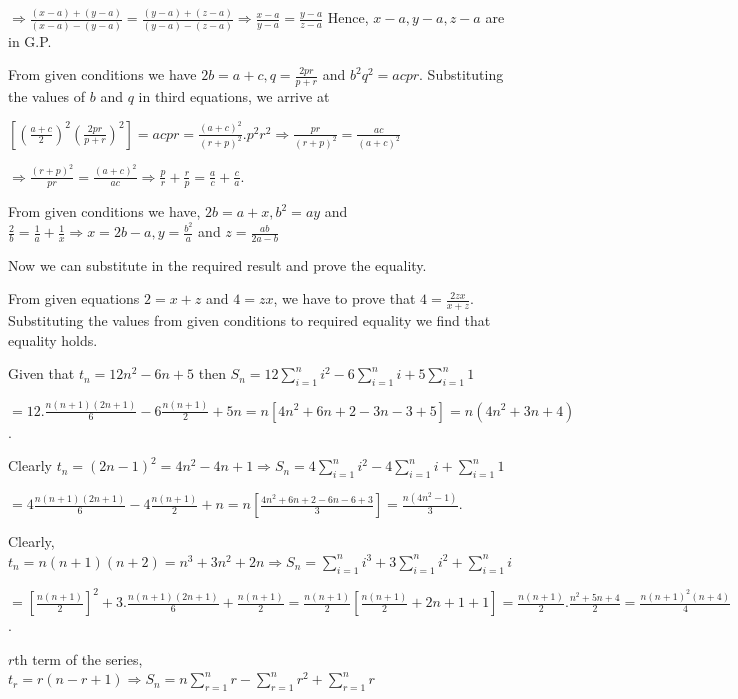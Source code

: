   $\Rightarrow  \frac{(x - a) + (y - a)}{(x - a) - (y - a)} = \frac{(y - a) + (z - a)}{(y - a) - (z -
    a)} \Rightarrow  \frac{x -
    a}{y - a} = \frac{y - a}{z - a}$
  Hence, $x - a, y - a, z - a$ are in G.P.
\item From given conditions we have $2b = a + c, q = \frac{2pr}{p + r}$ and $b^2q^2 = acpr$. Substituting
  the values of $b$ and $q$ in third equations, we arrive at

  $\left[\left(\frac{a + c}{2}\right)^2\left(\frac{2pr}{p + r}\right)^2\right] = acpr = \frac{(a + c)^2}{(r
    + p)^2}.p^2r^2 \Rightarrow \frac{pr}{(r + p)^2} = \frac{ac}{(a + c)^2}$

  $\Rightarrow \frac{(r + p)^2}{pr} = \frac{(a + c)^2}{ac} \Rightarrow \frac{p}{r} + \frac{r}{p} =
  \frac{a}{c} + \frac{c}{a}$.
\item From given conditions we have, $2b = a + x, b^2 = ay$ and $\frac{2}{b} = \frac{1}{a} + \frac{1}{x}
  \Rightarrow x = 2b - a, y = \frac{b^2}{a}$ and $z = \frac{ab}{2a - b}$

  Now we can substitute in the required result and prove the equality.
\item From given equations $2 = x + z$ and $4 = zx$, we have to prove that $4 = \frac{2zx}{x +
  z}$. Substituting the values from given conditions to required equality we find that equality holds.
\item Given that $t_n = 12n^2 - 6n + 5$ then $\displaystyle S_n = 12\sum_{i = 1}^ni^2 - 6\sum_{i=1}^ni + 5\sum_{i=1}^n1$

  $= 12.\frac{n(n + 1)(2n + 1)}{6} - 6\frac{n(n + 1)}{2} + 5n = n\left[4n^2 + 6n + 2 - 3n - 3 + 5\right]
  = n(4n^2 + 3n  + 4)$.
\item Clearly $t_n = (2n - 1)^2 = 4n^2 - 4n + 1 \Rightarrow \displaystyle S_n = 4\sum_{i =1}^ni^2 -
  4\sum_{i=1}^ni + \sum_{i=1}^n1$

  $= 4\frac{n(n + 1)(2n + 1)}{6}- 4\frac{n(n + 1)}{2} + n = n\left[\frac{4n^2 + 6n + 2 - 6n - 6 +
      3}{3}\right] = \frac{n(4n^2 -1)}{3}$.
\item Clearly, $t_n = n(n + 1)(n + 2) = n^3 + 3n^2 + 2n \Rightarrow \displaystyle S_n = \sum_{i= 1}^ni^3 +
  3\sum_{i=1}^n i^2 + \sum_{i=1}^ni$

  $= \left[\frac{n(n + 1)}{2}\right]^2 + 3.\frac{n(n + 1)(2n + 1)}{6} + \frac{n(n + 1)}{2} = \frac{n(n +
    1)}{2}\left[\frac{n(n + 1)}{2} + 2n + 1 + 1\right] = \frac{n(n + 1)}{2}.\frac{n^2 + 5n + 4}{2} =
  \frac{n(n + 1)^2(n + 4)}{4}$.
\item $r$th term of the series, $t_r = r(n - r + 1)\Rightarrow\displaystyle S_n = n\sum_{r=1}^nr -
  \sum_{r=1}^nr^2 + \sum_{r=1}^nr$

